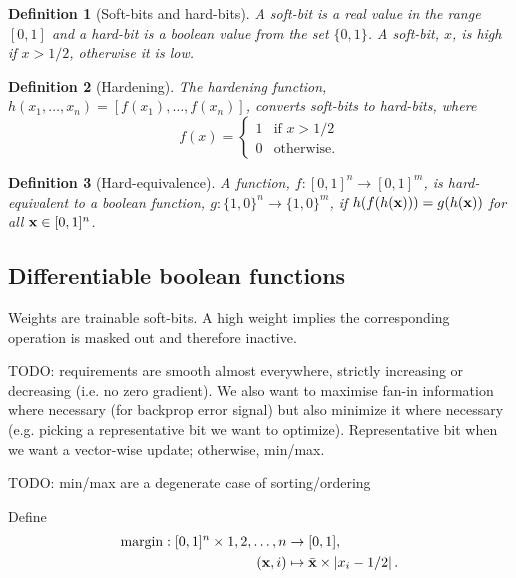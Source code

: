 \documentclass{article} %
\newtheorem*{definition}{Definition}
\begin{document}
\begin{definition}[Soft-bits and hard-bits]
A {\em soft-bit} is a real value in the range $[0,1]$ and a {\em hard-bit} is a boolean value from the set $\{0,1\}$. A soft-bit, $x$, is {\em high} if $x>1/2$, otherwise it is {\em low}.
\end{definition}

\begin{definition}[Hardening]
The {\em hardening} function, $h(x_{1}, \dots, x_{n}) = [f(x_{1}), \dots, f(x_{n})]$, converts soft-bits to hard-bits, where
\begin{equation*}
f(x) =
\begin{cases}
1 & \text{if } x > 1/2 \\
0 & \text{otherwise.}
\end{cases}
\end{equation*}
\end{definition}

\begin{definition}[Hard-equivalence]
	A function, $f: [0,1]^n \rightarrow [0,1]^m$, is {\em hard-equivalent} to a boolean function, $g: \{1,0\}^n \rightarrow \{1,0\}^m$,	if
	$h(f(h({\bf x}))) = g(h({\bf x}))$ for all ${\bf x} \in [0,1]^{n}$.
\end{definition}

\subsection{Differentiable boolean functions}

Weights are trainable soft-bits. A high weight implies the corresponding operation is masked out and therefore inactive.

TODO: requirements are smooth almost everywhere, strictly increasing or decreasing (i.e. no zero gradient). We also want to maximise fan-in information where necessary (for backprop error signal) but also minimize it where necessary (e.g. picking a representative bit we want to optimize). Representative bit when we want a vector-wise update; otherwise, min/max.

TODO: min/max are a degenerate case of sorting/ordering

Define 
\begin{equation*}
\begin{aligned}
\operatorname{margin}: [0,1]^{n} \times 1,2,\dots,n &\to [0,1],\\
({\bf x}, i) &\mapsto \bar{\bf x} \times \left|x_{i} - 1/2\right| \text{.}
\end{aligned}
\end{equation*}
\end{document}
